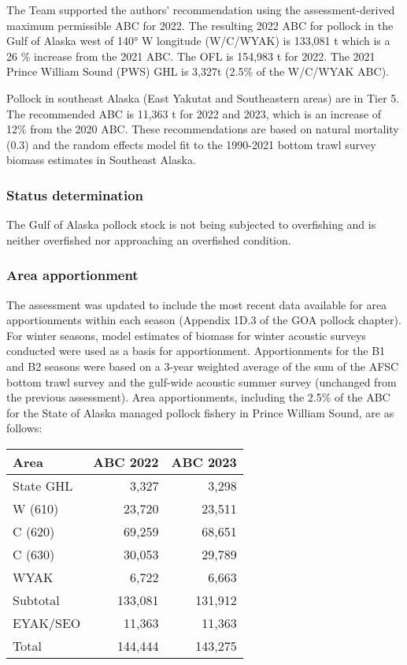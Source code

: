 \documentclass[]{tufte-handout}
\begin{document}
The Team supported the authors' recommendation using the
assessment-derived maximum permissible ABC for 2022. The resulting 2022
ABC for pollock in the Gulf of Alaska west of 140° W longitude
(W/C/WYAK) is 133,081 t which is a 26 \% increase from the 2021 ABC. The
OFL is 154,983 t for 2022. The 2021 Prince William Sound (PWS) GHL is
3,327t (2.5\% of the W/C/WYAK ABC).

Pollock in southeast Alaska (East Yakutat and Southeastern areas) are in
Tier 5. The recommended ABC is 11,363 t for 2022 and 2023, which is an
increase of 12\% from the 2020 ABC. These recommendations are based on
natural mortality (0.3) and the random effects model fit to the
1990-2021 bottom trawl survey biomass estimates in Southeast Alaska.

\hypertarget{status-determination}{%
\subsubsection{Status determination}\label{status-determination}}

The Gulf of Alaska pollock stock is not being subjected to overfishing
and is neither overfished nor approaching an overfished condition.

\hypertarget{area-apportionment}{%
\subsubsection{Area apportionment}\label{area-apportionment}}

The assessment was updated to include the most recent data available for
area apportionments within each season (Appendix 1D.3 of the GOA pollock
chapter). For winter seasons, model estimates of biomass for winter
acoustic surveys conducted were used as a basis for apportionment.
Apportionments for the B1 and B2 seasons were based on a 3-year weighted
average of the sum of the AFSC bottom trawl survey and the gulf-wide
acoustic summer survey (unchanged from the previous assessment). Area
apportionments, including the 2.5\% of the ABC for the State of Alaska
managed pollock fishery in Prince William Sound, are as follows:

\begin{table}
\centering
\begin{tabular}[t]{l|r|r}
\hline
Area & ABC 2022 & ABC 2023\\
\hline
State GHL & 3,327 & 3,298\\
\hline
W (610) & 23,720 & 23,511\\
\hline
C (620) & 69,259 & 68,651\\
\hline
C (630) & 30,053 & 29,789\\
\hline
WYAK & 6,722 & 6,663\\
\hline
Subtotal & 133,081 & 131,912\\
\hline
EYAK/SEO & 11,363 & 11,363\\
\hline
Total & 144,444 & 143,275\\
\hline
\end{tabular}
\end{table}
\end{document}
